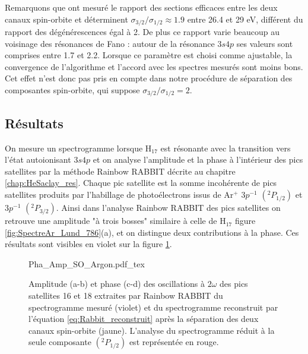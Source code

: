 Remarquons que  ont mesuré le rapport des sections efficaces entre les deux canaux spin-orbite et déterminent $\sigma_{3/2}/\sigma_{1/2} \approx 1.9$ entre 26.4 et 29 eV, différent du rapport des dégénérescences égal à 2. De plus ce rapport varie beaucoup au voisinage des résonances de Fano : autour de la résonance $3s4p$ ses valeurs sont comprises entre 1.7 et 2.2. Lorsque ce paramètre est choisi comme ajustable, la convergence de l'algorithme et l'accord avec les spectres mesurés sont moins bons. Cet effet n'est donc pas pris en compte dans notre procédure de séparation des composantes spin-orbite, qui suppose $\sigma_{3/2}/\sigma_{1/2} = 2$. 

\subsection{Résultats}
On mesure un spectrogramme lorsque H$_{17}$ est résonante avec la transition vers l'état autoionisant $3s4p$ et on analyse l'amplitude et la phase à l'intérieur des pics satellites par la méthode Rainbow RABBIT décrite au chapitre \ref{chap:HeSaclay_res}. Chaque pic satellite est la somme incohérente de pics satellites produits par l'habillage de photoélectrons issus de Ar$^+$ $3p^{-1}$ $(^{2}P_{1/2})$ et $3p^{-1}$ $(^{2}P_{3/2})$. Ainsi dans l'analyse Rainbow RABBIT des pics satellites on retrouve une amplitude "à trois bosses" similaire à celle de H$_{17}$ figure \ref{fig:SpectreAr_Lund_786}(a), et on distingue deux contributions à la phase. Ces résultats sont visibles en violet sur la figure \ref{fig:Pha_Amp_SO_Argon}.

\begin{figure}[ht]
\centering
\def\svgwidth{1\textwidth}
{Pha_Amp_SO_Argon.pdf_tex}
\caption{Amplitude (a-b) et phase (c-d) des oscillations à $2\omega$ des pics satellites 16 et 18 extraites par Rainbow RABBIT du spectrogramme mesuré (violet) et du spectrogramme reconstruit par l'équation \ref{eq:Rabbit_reconstruit} après la séparation des deux canaux spin-orbite (jaune). L'analyse du spectrogramme réduit à la seule composante $(^{2}P_{1/2})$ est représentée en rouge.}
\label{fig:Pha_Amp_SO_Argon}
\end{figure}


